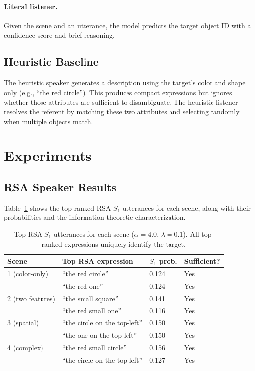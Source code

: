 \documentclass[10pt]{article}
\begin{document}
\paragraph{Literal listener.} Given the scene and an utterance, the model predicts the target object ID with a confidence score and brief reasoning.

\subsection{Heuristic Baseline}

The heuristic speaker generates a description using the target's color and shape only (e.g., ``the red circle''). This produces compact expressions but ignores whether those attributes are sufficient to disambiguate. The heuristic listener resolves the referent by matching these two attributes and selecting randomly when multiple objects match.

\section{Experiments}
\label{sec:experiments}

\subsection{RSA Speaker Results}

Table~\ref{tab:rsa} shows the top-ranked RSA $S_1$ utterances for each scene, along with their probabilities and the information-theoretic characterization.

\begin{table}[h]
\centering
\small
\begin{tabular}{lp{5.5cm}ll}
\toprule
Scene & Top RSA expression & $S_1$ prob. & Sufficient? \\
\midrule
1 (color-only) & ``the red circle'' & 0.124 & Yes \\
               & ``the red one''    & 0.124 & Yes \\
2 (two features) & ``the small square'' & 0.141 & Yes \\
                 & ``the red small one'' & 0.116 & Yes \\
3 (spatial)      & ``the circle on the top-left'' & 0.150 & Yes \\
                 & ``the one on the top-left'' & 0.150 & Yes \\
4 (complex)      & ``the red small circle'' & 0.156 & Yes \\
                 & ``the circle on the top-left'' & 0.127 & Yes \\
\bottomrule
\end{tabular}
\caption{Top RSA $S_1$ utterances for each scene ($\alpha{=}4.0$, $\lambda{=}0.1$). All top-ranked expressions uniquely identify the target.}
\label{tab:rsa}
\end{table}
\end{document}
